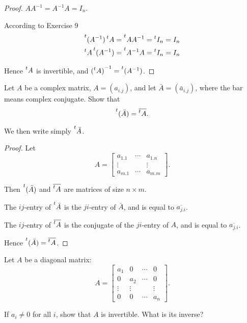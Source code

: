 \begin{proof}
    $AA^{-1} = A^{-1}A = I_{n}$.

    According to Exercise 9
    \[
        \begin{split}
            \prescript{t}{}{(A^{-1})}\prescript{t}{}{A} = \prescript{t}{}{AA^{-1}} = \prescript{t}{}{I_{n}} = I_{n} \\
            \prescript{t}{}{A}\prescript{t}{}{(A^{-1})} = \prescript{t}{}{A^{-1}A} = \prescript{t}{}{I_{n}} = I_{n}
        \end{split}
    \]

    Hence $\prescript{t}{}{A}$ is invertible, and ${(\prescript{t}{}{A})}^{-1} = \prescript{t}{}{(A^{-1})}$.
\end{proof}

\begin{exercise}
    Let $A$ be a complex matrix, $A = {(a_{i.j})}$, and let $\bar{A} = {(\bar{a}_{i.j})}$, where the bar means complex conjugate. Show that
    \[
        \prescript{t}{}{(\bar{A})} = \overline{\prescript{t}{}{A}}.
    \]

    We then write simply $\prescript{t}{}{\bar{A}}$.
\end{exercise}

\begin{proof}
    Let
    \[
        A = \begin{bmatrix}
            a_{1.1} & \cdots & a_{1.n} \\
            \vdots  &        & \vdots  \\
            a_{m.1} & \cdots & a_{m.m}
        \end{bmatrix}.
    \]

    Then $\prescript{t}{}{(\bar{A})}$ and $\overline{\prescript{t}{}{A}}$ are matrices of size $n\times m$.

    The $ij$-entry of $\prescript{t}{}{\bar{A}}$ is the $ji$-entry of $\bar{A}$, and is equal to $\overline{a_{j.i}}$.

    The $ij$-entry of $\overline{\prescript{t}{}{A}}$ is the conjugate of the $ji$-entry of $A$, and is equal to $\overline{a_{j.i}}$.

    Hence $\prescript{t}{}{(\bar{A})} = \overline{\prescript{t}{}{A}}$.
\end{proof}

\begin{exercise}
    Let $A$ be a diagonal matrix:
    \[
        A = \begin{bmatrix}
            a_{1}  & 0      & \cdots & 0      \\
            0      & a_{2}  & \cdots & 0      \\
            \vdots & \vdots &        & \vdots \\
            0      & 0      & \cdots & a_{n}
        \end{bmatrix}.
    \]

    If $a_{i}\ne 0$ for all $i$, show that $A$ is invertible. What is its inverse?
\end{exercise}

